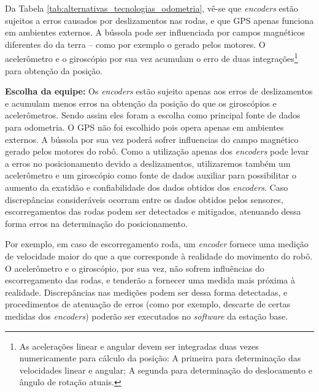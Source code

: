 Da Tabela \ref{tab:alternativas_tecnologias_odometria}, vê-se que \textit{encoders} estão sujeitos a erros causados por deslizamentos nas rodas, e que GPS apenas funciona em ambientes externos. A bússola pode ser influenciada por campos magnéticos diferentes do da terra -- como por exemplo o gerado pelos motores. O acelerômetro e o giroscópio por sua vez acumulam o erro de duas integrações\footnote{As acelerações linear e angular devem ser integradas duas vezes numericamente para cálculo da posição: A primeira para determinação das velocidades linear e angular; A segunda para determinação do deslocamento e ângulo de rotação atuais.} para obtenção da posição.

\textbf{Escolha da equipe:} Os \textit{encoders} estão sujeito apenas aos erros de deslizamentos e acumulam menos erros na obtenção da posição do que os giroscópios e acelerômetros. Sendo assim eles foram a escolha como principal fonte de dados para odometria. O GPS não foi escolhido pois opera apenas em ambientes externos. A bússola por sua vez poderá sofrer influencias do campo magnético gerado pelos motores do robô. Como a utilização apenas dos \textit{encoders} pode levar a erros no posicionamento devido a deslizamentos, utilizaremos também um acelerômetro e um giroscópio como fonte de dados auxiliar para possibilitar o aumento da exatidão e confiabilidade dos dados obtidos dos \textit{encoders}. Caso discrepâncias consideráveis ocorram entre os dados obtidos pelos sensores, escorregamentos das rodas podem ser detectados e mitigados, atenuando dessa forma erros na determinação do posicionamento.

Por exemplo, em caso de escorregamento roda, um \textit{encoder} fornece uma medição de velocidade maior do que a que corresponde à realidade do movimento do robô. O acelerômetro e o giroscópio, por sua vez, não sofrem influências do escorregamento das rodas, e tenderão a fornecer uma medida mais próxima à realidade. Discrepâncias nas medições podem ser dessa forma detectadas, e procedimentos de atenuação de erros (como por exemplo, descarte de certas medidas dos \textit{encoders}) poderão ser executados no \textit{software} da estação base.


